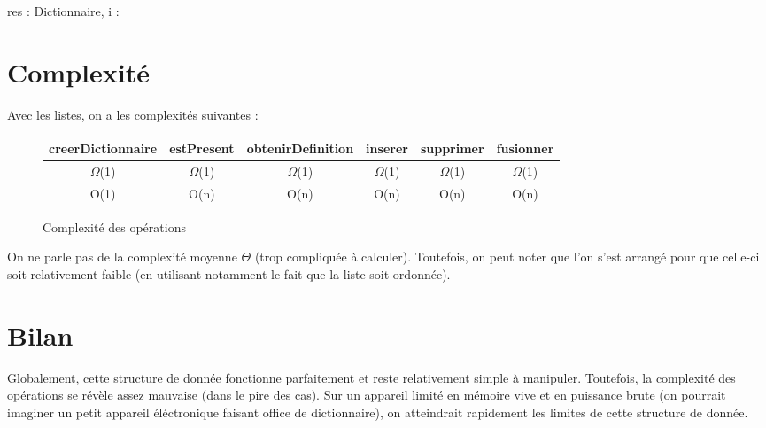 \documentclass[a4paper, titlepage]{livret} %
\begin{document}
				\begin{algorithme}
					{res : Dictionnaire, i : \caractere}{
					}\\
				\end{algorithme}


		\section{Complexité}
			Avec les listes, on a les complexités suivantes :
			\begin{figure}[!ht]
				\begin{tabular}{|*{6}{c|}}
    				\hline
    				creerDictionnaire & estPresent & obtenirDefinition & inserer & supprimer & fusionner \\
    				\hline
    				$\Omega$(1) & $\Omega$(1) & $\Omega$(1) & $\Omega$(1) & $\Omega$(1) & $\Omega$(1) \\
    				\hline
    				O(1) & O(n) & O(n) & O(n) & O(n) & O(n) \\
    				\hline
				\end{tabular}
				\caption{Complexité des opérations}
			\end{figure}

			On ne parle pas de la complexité moyenne $\Theta$ (trop compliquée à calculer).
			Toutefois, on peut noter que l'on s'est arrangé pour que celle-ci soit relativement faible (en utilisant notamment le fait que la liste soit ordonnée).

		\section{Bilan}
			Globalement, cette structure de donnée fonctionne parfaitement et reste relativement simple à manipuler.
			Toutefois, la complexité des opérations se révèle assez mauvaise (dans le pire des cas).
			Sur un appareil limité en mémoire vive et en \og puissance brute \fg{} (on pourrait imaginer un petit appareil éléctronique faisant office de dictionnaire), on atteindrait rapidement les limites de cette structure de donnée.

\end{document}
